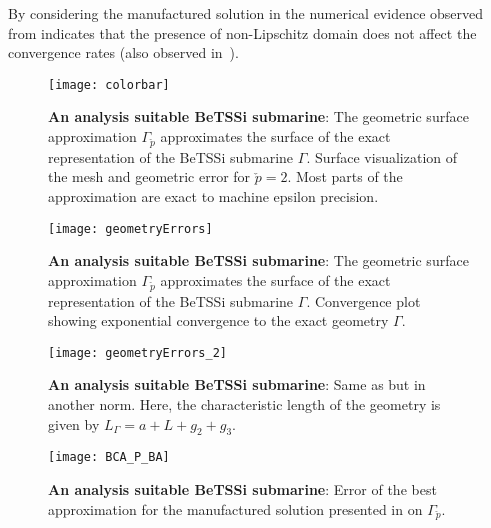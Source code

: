 By considering the manufactured solution in  the numerical evidence observed from  indicates that the presence of non-Lipschitz domain does not affect the convergence rates (also observed in~\cite{Lipton2010roi}).
\begin{figure}
	\centering    
	\texttt{[image: colorbar]}
	\caption{\textbf{An analysis suitable BeTSSi submarine}: The geometric surface approximation $\Gamma_{\check{p}}$ approximates the surface of the exact representation of the BeTSSi submarine $\Gamma$. Surface visualization of the mesh and geometric error for $\check{p}=2$. Most parts of the approximation are exact to machine epsilon precision.}
	\label{Fig3:geometricError}
\end{figure}
\begin{figure}
	\centering    
	\texttt{[image: geometryErrors]}
	\caption{\textbf{An analysis suitable BeTSSi submarine}: The geometric surface approximation $\Gamma_{\check{p}}$ approximates the surface of the exact representation of the BeTSSi submarine $\Gamma$. Convergence plot showing exponential convergence to the exact geometry $\Gamma$.}
	\label{Fig3:geometricErrorsL2_1}
\end{figure}
\begin{figure}
	\centering    
	\texttt{[image: geometryErrors\_2]}
	\caption{\textbf{An analysis suitable BeTSSi submarine}: Same as  but in another norm. Here, the characteristic length of the geometry is given by $L_\Gamma = a+L+g_2+g_3$.}
	\label{Fig3:geometricErrorsL2_2}
\end{figure}
\begin{figure}
	\centering    
	\texttt{[image: BCA\_P\_BA]}
	\caption{\textbf{An analysis suitable BeTSSi submarine}: Error of the best approximation for the manufactured solution presented in  on $\Gamma_{\check{p}}$.}
	\label{Fig3:BCA_P_BA}
\end{figure}

